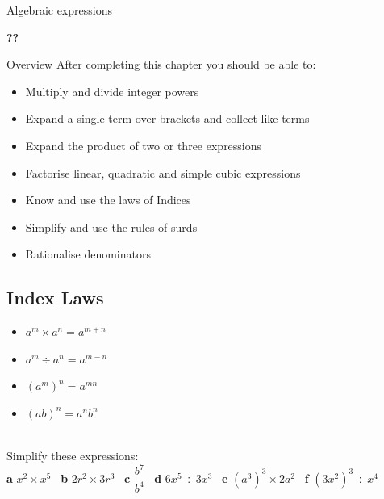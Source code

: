\documentclass[fleqn]{article}
\newcommand\getcurrentref[1]{%
 \ifnumequal{\value{#1}}{0}
  {??}
  {\the\value{#1}}%
}
\newcommand\YUGE{\fontsize{35}{35}\selectfont}
\newcommand{\bookletunittitle}{Algebraic expressions}				%
\begin{document}
\newpage
\pagestyle{plain}
\setcounter{page}{1}
\begin{minipage}[t]{.85\textwidth}
		\sffamily{}
		\bfseries\YUGE\raggedright\bookletunittitle\\
\end{minipage}
\begin{minipage}[t]{.15\textwidth}
		\sffamily
		\bfseries\YUGE\raggedleft\getcurrentref{section}
\end{minipage}

\begin{mybox2}[colbacktitle=green]{Overview}
	After completing this chapter you should be able to:
	\begin{itemize}
		\item Multiply and divide integer powers
		\item Expand a single term over brackets and collect like terms
		\item Expand the product of two or three expressions
		\item Factorise linear, quadratic and simple cubic expressions
		\item Know and use the laws of Indices
		\item Simplify and use the rules of surds
		\item Rationalise denominators
	\end{itemize}
\end{mybox2}




\subsection{Index Laws}
\begin{itemize}
	\item $a^m \times a^n = a^{m+n}$
	\item $a^m \div a^n = a^{m-n}$
	\item $(a^m)^n = a^{mn}$
	\item $(ab)^n = a^nb^n$
\end{itemize}




\begin{examplebox}{}{}
	\\ %
	Simplify these expressions:\\
	\textbf{a}\hspace{2mm} $x^2 \times x^5$			\hspace{7mm} \
	\textbf{b}\hspace{2mm} $2r^2 \times 3r^3$ 		\hspace{7mm} \
	\textbf{c}\hspace{2mm} $\dfrac{b^7}{b^4}$ 		\hspace{7mm} \
	\textbf{d}\hspace{2mm} $6x^5 \div 3x^3$ 			\hspace{7mm} \
	\textbf{e}\hspace{2mm} $(a^3)^3 \times 2a^2$ 	\hspace{7mm} \
	\textbf{f}\hspace{2mm} $(3x^2)^3 \div x^4$
\end{examplebox}
\end{document}
